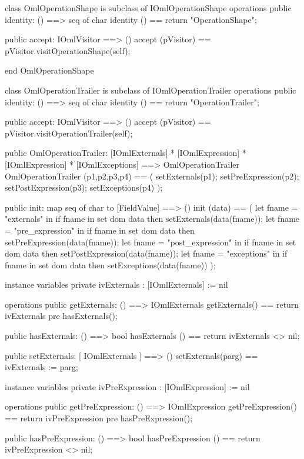 \begin{vdm_al}
class OmlOperationShape is subclass of IOmlOperationShape
operations
  public identity: () ==> seq of char
  identity () == return "OperationShape";

  public accept: IOmlVisitor ==> ()
  accept (pVisitor) == pVisitor.visitOperationShape(self);

end OmlOperationShape
\end{vdm_al}
\begin{vdm_al}
class OmlOperationTrailer is subclass of IOmlOperationTrailer
operations
  public identity: () ==> seq of char
  identity () == return "OperationTrailer";

  public accept: IOmlVisitor ==> ()
  accept (pVisitor) == pVisitor.visitOperationTrailer(self);

  public OmlOperationTrailer:
      [IOmlExternals] *
      [IOmlExpression] *
      [IOmlExpression] *
      [IOmlExceptions] ==> OmlOperationTrailer
  OmlOperationTrailer (p1,p2,p3,p4) == 
   ( setExternals(p1);
     setPreExpression(p2);
     setPostExpression(p3);
     setExceptions(p4) );

  public init: map seq of char to [FieldValue] ==> ()
  init (data) ==
    ( let fname = "externals" in
        if fname in set dom data
        then setExternals(data(fname));
      let fname = "pre_expression" in
        if fname in set dom data
        then setPreExpression(data(fname));
      let fname = "post_expression" in
        if fname in set dom data
        then setPostExpression(data(fname));
      let fname = "exceptions" in
        if fname in set dom data
        then setExceptions(data(fname)) );

instance variables
  private ivExternals : [IOmlExternals] := nil

operations
  public getExternals: () ==> IOmlExternals
  getExternals() == return ivExternals
    pre hasExternals();

  public hasExternals: () ==> bool
  hasExternals () == return ivExternals <> nil;

  public setExternals: [ IOmlExternals ] ==> ()
  setExternals(parg) == ivExternals := parg;

instance variables
  private ivPreExpression : [IOmlExpression] := nil

operations
  public getPreExpression: () ==> IOmlExpression
  getPreExpression() == return ivPreExpression
    pre hasPreExpression();

  public hasPreExpression: () ==> bool
  hasPreExpression () == return ivPreExpression <> nil;


\end{vdm_al}
